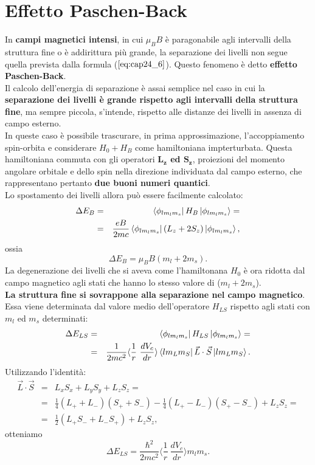 \section{Effetto Paschen-Back}
In \textbf{campi magnetici intensi}, in cui $\mu_B B$ è paragonabile agli intervalli della struttura fine o è addirittura più grande, la separazione dei livelli non segue quella prevista dalla formula ($\ref{eq:cap24_6}$). Questo fenomeno è detto \textbf{effetto Paschen-Back}. \\
Il calcolo dell'energia di separazione è assai semplice nel caso in cui la \textbf{separazione dei livelli è grande rispetto agli intervalli della struttura fine}, ma sempre piccola, s'intende, rispetto alle distanze dei livelli in assenza di campo esterno. \\
In queste caso è possibile trascurare, in prima approssimazione, l'accoppiamento spin-orbita e considerare $ H_0+H_B $ come hamiltoniana impterturbata. Questa hamiltoniana commuta con gli operatori \textbf{$\boldsymbol{L_z}$ ed $\boldsymbol{S_z}$}, proiezioni del momento angolare orbitale e dello spin nella direzione individuata dal campo esterno, che rappresentano pertanto \textbf{due buoni numeri quantici}. \\
Lo spostamento dei livelli allora può essere facilmente calcolato: 
\begin{eqnarray}
\Delta E_B & = &\bra{\phi_{lm_lm_s}} H_B \ket{\phi_{lm_lm_s}}=\nonumber  \\
& =& \frac{eB}{2mc}\bra{\phi_{lm_lm_s}} \left( L_z+2S_z  \right)\ket{\phi_{lm_lm_s}} ,
\end{eqnarray}
ossia 
\begin{equation}
\Delta E_B = \mu_B B \left( m_l+2m_s\right) .
\end{equation}
La degenerazione dei livelli che si aveva come l'hamiltonana $H_0$ è ora ridotta dal campo magnetico agli stati che hanno lo stesso valore di ($m_l+2m_s$). \\
\textbf{La struttura fine si sovrappone alla separazione nel campo magnetico}. Essa viene determinata dal valore medio dell'operatore $H_{LS}$ rispetto agli stati con $m_l$ ed $m_s$ determinati:
\begin{eqnarray}
\Delta E_{LS} & =& \bra{\phi_{lm_lm_s}} H_{LS} \ket{\phi_{lm_lm_s}}= \nonumber \\
& = &\frac{1}{2mc^2} \langle \frac{1}{r} \ \frac{dV_c}{dr}   \rangle \bra{lm_Lm_S} \vec{L} \cdot \vec{S} \ket{lm_Lm_S} .
\end{eqnarray}
Utilizzando l'identità:
\begin{eqnarray}
\vec{L} \cdot \vec{S} & = & L_xS_x+L_yS_y+L_zS_z= \nonumber  \\
& = & \frac{1}{4} \left( L_{+}+L_{-} \right)  \left( S_{+}+S_{-}\right)-\frac{1}{4} \left( L_{+}-L_{-} \right) \left( S_{+}-S_{-} \right)+L_zS_z =  \nonumber \\
& = &\frac{1}{2} \left( L_{+}S_{-}+L_{-}S_{+} \right)+ L_zS_z ,
\end{eqnarray}
otteniamo
\begin{equation}
\Delta E_{LS}= \frac{\hbar^2}{2mc^2} \langle \frac{1}{r} \ \frac{dV_c}{dr}   \rangle m_lm_s .
\end{equation}
